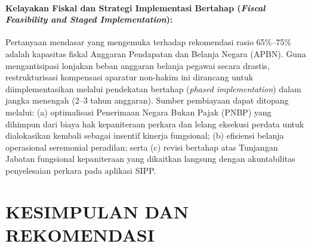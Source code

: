 \documentclass[12pt, a4paper]{article}
\begin{document}
\paragraph{Kelayakan Fiskal dan Strategi Implementasi Bertahap (\textit{Fiscal Feasibility and Staged Implementation}):} Pertanyaan mendasar yang mengemuka terhadap rekomendasi rasio 65\%--75\% adalah kapasitas fiskal Anggaran Pendapatan dan Belanja Negara (APBN). Guna mengantisipasi lonjakan beban anggaran belanja pegawai secara drastis, restrukturisasi kompensasi aparatur non-hakim ini dirancang untuk diimplementasikan melalui pendekatan bertahap (\textit{phased implementation}) dalam jangka menengah (2--3 tahun anggaran). Sumber pembiayaan dapat ditopang melalui: (a) optimalisasi Penerimaan Negara Bukan Pajak (PNBP) yang dihimpun dari biaya hak kepaniteraan perkara dan lelang eksekusi perdata untuk dialokasikan kembali sebagai insentif kinerja fungsional; (b) efisiensi belanja operasional seremonial peradilan; serta (c) revisi bertahap atas Tunjangan Jabatan fungsional kepaniteraan yang dikaitkan langsung dengan akuntabilitas penyelesaian perkara pada aplikasi SIPP.

\section{KESIMPULAN DAN REKOMENDASI}
\end{document}
